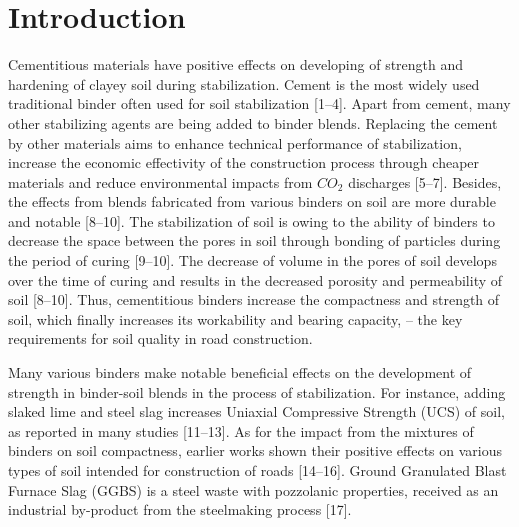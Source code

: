 \documentclass[electronics,article,submit,pdftex,moreauthors]{Definitions/mdpi}
\begin{document}
\section{Introduction}

Cementitious materials have positive effects on developing of strength and hardening of clayey soil during stabilization. Cement is the most widely used traditional binder often used for soil stabilization [1–4]. Apart from cement, many other stabilizing agents are being added to binder blends. Replacing the cement by other materials aims to enhance technical performance of stabilization, increase the economic effectivity of the construction process through cheaper materials and reduce environmental impacts from $CO_2$ discharges [5–7]. Besides, the effects from blends fabricated from various binders on soil are more durable and notable [8–10]. The stabilization of soil is owing to the ability of binders to decrease the space between the pores in soil through bonding of particles during the period of curing [9–10]. The decrease of volume in the pores of soil develops over the time of curing and results in the decreased porosity and permeability of soil [8–10]. Thus, cementitious binders increase the compactness and strength of soil, which finally increases its workability and bearing capacity, – the key requirements for soil quality in road construction.	

Many various binders make notable beneficial effects on the development of strength in binder-soil blends in the process of stabilization. For instance, adding slaked lime and steel slag increases Uniaxial Compressive Strength (UCS) of soil, as reported in many studies [11–13]. As for the impact from the mixtures of binders on soil compactness, earlier works shown their positive effects on various types of soil intended for construction of roads [14–16]. Ground Granulated Blast Furnace Slag (GGBS) is a steel waste with pozzolanic properties, received as an industrial by-product from the steelmaking process [17]. 
\end{document}
